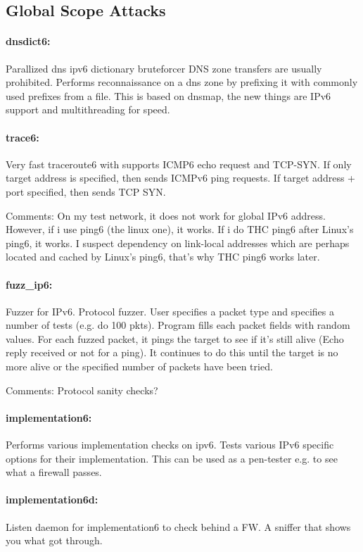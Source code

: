 \documentclass{article}
\begin{document}
\subsection{Global Scope Attacks}

\paragraph*{dnsdict6:} Parallized dns ipv6 dictionary bruteforcer  
DNS zone transfers are usually prohibited. Performs reconnaissance on a dns zone by prefixing it with commonly used prefixes from a file. This is based on dnsmap, the new things are IPv6 support and multithreading for speed.

\paragraph*{trace6:} Very fast traceroute6 with supports ICMP6 echo request and TCP-SYN. If only target address is specified, then sends ICMPv6 ping requests. If target address + port specified, then sends TCP SYN. 

Comments: On my test network, it does not work for global IPv6 address. However, if i use ping6 (the linux one), it works. If i do THC ping6 after Linux's ping6, it works. I suspect dependency on link-local addresses which are perhaps located and cached by Linux's ping6, that's why THC ping6 works later.  

\paragraph*{fuzz\_ip6:} Fuzzer for IPv6. Protocol fuzzer. User specifies a packet type and specifies a number of tests (e.g. do 100 pkts). Program fills each packet fields with random values. For each fuzzed packet, it pings the target to see if it's still alive (Echo reply received or not for a ping). It continues to do this until the target is no more alive or the specified number of packets have been tried. 
 
Comments: Protocol sanity checks?

\paragraph*{implementation6:} Performs various implementation checks on ipv6. Tests various IPv6 specific options for their implementation. This can be used as a pen-tester e.g. to see what a firewall passes.

\paragraph*{implementation6d:} Listen daemon for implementation6 to check behind a FW. A sniffer that shows you what got through.
\end{document}
